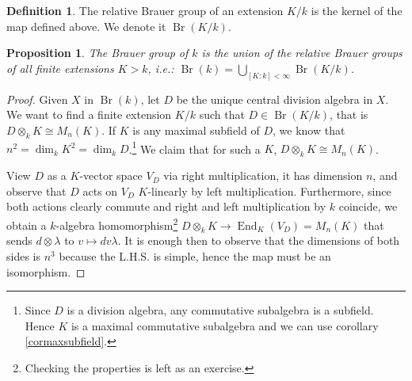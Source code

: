 \documentclass{tufte-handout} %
\newtheorem{prop}[thm]{Proposition}
\theoremstyle{definition}
\newtheorem{defn}[thm]{Definition}
\theoremstyle{remark}
\DeclareMathOperator{\End}{End}
\DeclareMathOperator{\Br}{Br}
\begin{document}
\begin{defn}
	The relative Brauer group of an extension $K/k$ is the kernel of the map defined above. We denote it $\Br(K/k)$.
\end{defn}
\begin{prop}\label{brauerfiniteext} The Brauer group of $k$ is the union of the relative Brauer groups of all finite extensions $K>k$, i.e.:
	$\Br(k) = \bigcup_{[K:k] < \infty} \Br(K/k)$.
\end{prop}
\begin{proof}
	Given $X$ in $\Br(k)$, let $D$ be the unique central division algebra in $X$. We want to find a finite extension $K/k$ such that $D \in \Br(K/k)$, that is $D \otimes_k K \cong M_n(K)$. If $K$ is any maximal subfield of $D$, we know that $n^2 = \dim_kK^2 = \dim_kD$.\footnote{Since $D$ is a division algebra, any commutative subalgebra is a subfield. Hence $K$ is a maximal commutative subalgebra and we can use corollary \ref{cormaxsubfield}.} We claim that for such a $K$, $D \otimes_k K \cong M_n(K)$.
	
	View $D$ as a $K$-vector space $V_D$ via right multiplication, it has dimension $n$, and observe that $D$ acts on $V_D$ $K$-linearly by left multiplication. Furthermore, since both actions clearly commute and right and left multiplication by $k$ coincide, we obtain a $k$-algebra homomorphism\footnote{Checking the properties is left as an exercise.} $D \otimes_k K \rightarrow \End_K(V_D) = M_n(K)$  that sends $d \otimes \lambda$ to $v \mapsto dv\lambda$. It is enough then to observe that the dimensions of both sides is $n^3$ because the L.H.S. is simple, hence the map must be an isomorphism.
\end{proof}
\end{document}
